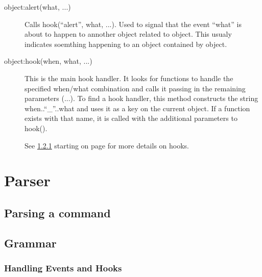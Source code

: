 \documentclass{book}
\begin{document}
\begin{description}
\item[object:alert(what, ...)] Calls hook(``alert'', what, ...). Used
  to signal that the event ``what'' is about to happen to annother object
  related to object. This usualy indicates soemthing happening to an
  object contained by object.
\item[object:hook(when, what, ...)] This is the main hook handler. It
  looks for functions to handle the specified when/what combination
  and calls it passing in the remaining parameters (...). To find a
  hook handler, this method constructs the string when..``\_''..what
  and uses it as a key on the current object. If a function exists
  with that name, it is called with the additional parameters to
  hook().

  See \ref{section:handlingEventsAndHooks} starting on page
  \pageref{section:handlingEventsAndHooks} for more details on hooks.
\end{description}



\section{Parser}
\subsection{Parsing a command}
\label{section:parsingACommand}

\subsection{Grammar}

\subsubsection{Handling Events and Hooks}
\label{section:handlingEventsAndHooks}
\end{document}
